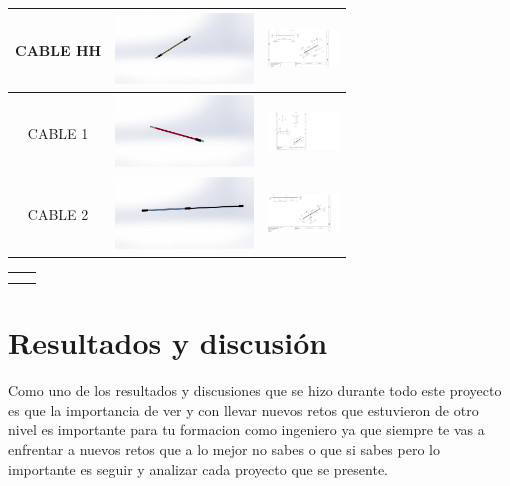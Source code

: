 \begin{table} [H]
\begin{tabular}   {| c |  c |  c | }
        \hline
        CABLE HH & \includegraphics[height=19mm]{7/img/cinco.PNG}  & 
       \includegraphics[width=19mm]{7/img/Pieza5.PNG} \\
        \hline 
         CABLE 1 & \includegraphics[height=19mm]{7/img/seis.PNG}  & 
       \includegraphics[width=19mm]{7/img/heymickey.PNG} \\
        \hline 
         CABLE 2 & \includegraphics[height=19mm]{7/img/siete.PNG}  & 
       \includegraphics[width=19mm]{7/img/siu.PNG} \\
        \hline 
        
        \end{tabular} 
       
         \label {tab:my_label3}  \label {}
          \end{table} 
    
      \begin{tabular}{c|c}
           &  \\
           & 
      \end{tabular}  
    
    
    \section{Resultados y discusión}
    
    Como uno de los resultados y discusiones que se hizo durante todo este proyecto es que la importancia de ver y con llevar nuevos retos que estuvieron de otro nivel es importante para tu formacion como ingeniero ya que  siempre te vas a enfrentar a nuevos retos que a lo mejor no sabes o que si sabes pero lo importante es seguir y analizar cada proyecto que se presente. 
    
